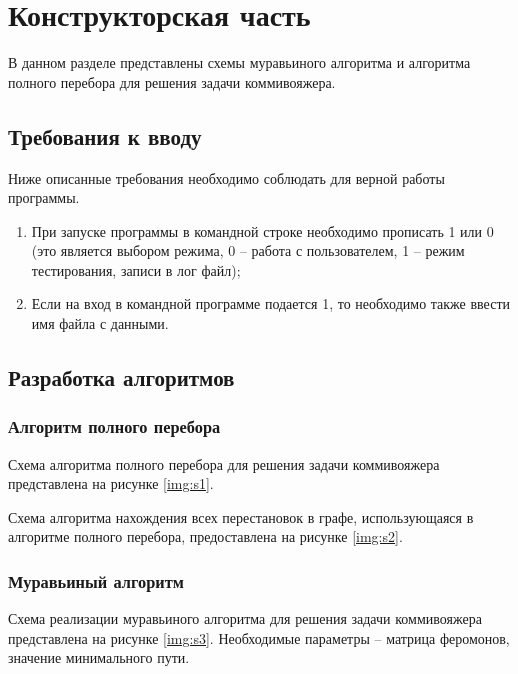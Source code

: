 \chapter{Конструкторская часть}
В данном разделе представлены схемы муравьиного алгоритма и алгоритма полного перебора для решения задачи коммивояжера.

\section{Требования к вводу}
Ниже описанные требования необходимо соблюдать для верной работы программы.

\begin{enumerate}
	\item При запуске программы в командной строке необходимо прописать 1 или 0 (это является выбором режима, 0 -- работа с пользователем, 1 -- режим тестирования, записи в лог файл);
	\item Если на вход в командной программе подается 1, то необходимо также ввести имя файла с данными.
\end{enumerate}

\section{Разработка алгоритмов}

\subsection{Алгоритм полного перебора}
Схема алгоритма полного перебора для решения задачи коммивояжера представлена на рисунке \ref{img:s1}. 


\newpage

Схема алгоритма нахождения всех перестановок в графе, использующаяся в алгоритме полного перебора, предоставлена на рисунке \ref{img:s2}.


\newpage

\subsection{Муравьиный алгоритм}

Схема реализации муравьиного алгоритма для решения задачи коммивояжера представлена на рисунке \ref{img:s3}.
Необходимые параметры -- матрица феромонов, значение минимального пути.


